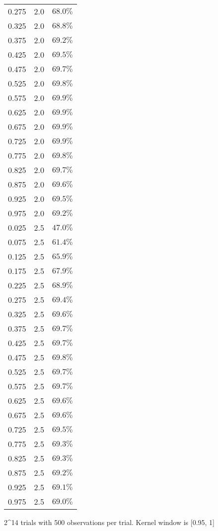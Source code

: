 \begin{longtable}{rrr}
0.275 & 2.0 & $68.0\%$ \\ 
0.325 & 2.0 & $68.8\%$ \\ 
0.375 & 2.0 & $69.2\%$ \\ 
0.425 & 2.0 & $69.5\%$ \\ 
0.475 & 2.0 & $69.7\%$ \\ 
0.525 & 2.0 & $69.8\%$ \\ 
0.575 & 2.0 & $69.9\%$ \\ 
0.625 & 2.0 & $69.9\%$ \\ 
0.675 & 2.0 & $69.9\%$ \\ 
0.725 & 2.0 & $69.9\%$ \\ 
0.775 & 2.0 & $69.8\%$ \\ 
0.825 & 2.0 & $69.7\%$ \\ 
0.875 & 2.0 & $69.6\%$ \\ 
0.925 & 2.0 & $69.5\%$ \\ 
0.975 & 2.0 & $69.2\%$ \\ 
0.025 & 2.5 & $47.0\%$ \\ 
0.075 & 2.5 & $61.4\%$ \\ 
0.125 & 2.5 & $65.9\%$ \\ 
0.175 & 2.5 & $67.9\%$ \\ 
0.225 & 2.5 & $68.9\%$ \\ 
0.275 & 2.5 & $69.4\%$ \\ 
0.325 & 2.5 & $69.6\%$ \\ 
0.375 & 2.5 & $69.7\%$ \\ 
0.425 & 2.5 & $69.7\%$ \\ 
0.475 & 2.5 & $69.8\%$ \\ 
0.525 & 2.5 & $69.7\%$ \\ 
0.575 & 2.5 & $69.7\%$ \\ 
0.625 & 2.5 & $69.6\%$ \\ 
0.675 & 2.5 & $69.6\%$ \\ 
0.725 & 2.5 & $69.5\%$ \\ 
0.775 & 2.5 & $69.3\%$ \\ 
0.825 & 2.5 & $69.3\%$ \\ 
0.875 & 2.5 & $69.2\%$ \\ 
0.925 & 2.5 & $69.1\%$ \\ 
0.975 & 2.5 & $69.0\%$ \\ 
\bottomrule
\end{longtable}
\begin{minipage}{\linewidth}
2\textasciicircum{}14 trials with 500 observations per trial. Kernel window is [0.95, 1]\\
\end{minipage}

